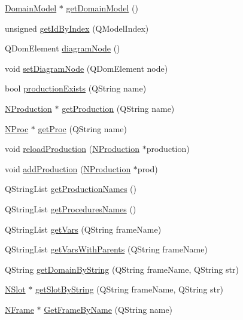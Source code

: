 \begin{DoxyCompactItemize}
\item 
\hyperlink{class_domain_model}{DomainModel} $\ast$ \hyperlink{class_n_k_b_manager_a2e511c4b72d5c37f68e56f5c48a71477}{getDomainModel} ()
\item 
unsigned \hyperlink{class_n_k_b_manager_a66b2ef2921ef36d82f64990c5418c9c7}{getIdByIndex} (QModelIndex)
\item 
QDomElement \hyperlink{class_n_k_b_manager_a2161515ea3db6b40ed6346bd5b48352e}{diagramNode} ()
\item 
void \hyperlink{class_n_k_b_manager_aec946a5cbd7eb0c39b49e150602b9448}{setDiagramNode} (QDomElement node)
\item 
bool \hyperlink{class_n_k_b_manager_afcfa017eba3e5a205f5156a7829b6296}{productionExists} (QString name)
\item 
\hyperlink{class_n_production}{NProduction} $\ast$ \hyperlink{class_n_k_b_manager_ae580a117905981065dec5e574822daaa}{getProduction} (QString name)
\item 
\hyperlink{class_n_proc}{NProc} $\ast$ \hyperlink{class_n_k_b_manager_a514cd566b9016534886f33e86627884d}{getProc} (QString name)
\item 
void \hyperlink{class_n_k_b_manager_a826268ead42db6e5dfc726a5ef731c21}{reloadProduction} (\hyperlink{class_n_production}{NProduction} $\ast$production)
\item 
void \hyperlink{class_n_k_b_manager_ad07acf1855fd0d24c83d1c5e650e52d7}{addProduction} (\hyperlink{class_n_production}{NProduction} $\ast$prod)
\item 
QStringList \hyperlink{class_n_k_b_manager_adc882ed03a920d16d762274ef422cbc6}{getProductionNames} ()
\item 
QStringList \hyperlink{class_n_k_b_manager_a67b9c914829efb8644f341e195d5e139}{getProceduresNames} ()
\item 
QStringList \hyperlink{class_n_k_b_manager_a184cbc15229b7ab26ae7e03388ec64db}{getVars} (QString frameName)
\item 
QStringList \hyperlink{class_n_k_b_manager_a0f9ef5a3d21d36319335e260eececd30}{getVarsWithParents} (QString frameName)
\item 
QString \hyperlink{class_n_k_b_manager_a6ca8c9ea71bf8a94d240a711c39b14b8}{getDomainByString} (QString frameName, QString str)
\item 
\hyperlink{class_n_slot}{NSlot} $\ast$ \hyperlink{class_n_k_b_manager_a08f75b68643ea6625bd9908e0b022e12}{getSlotByString} (QString frameName, QString str)
\item 
\hyperlink{class_n_frame}{NFrame} $\ast$ \hyperlink{class_n_k_b_manager_a50c0730b0fb91588252d550fa7007292}{GetFrameByName} (QString name)

\end{DoxyCompactItemize}
